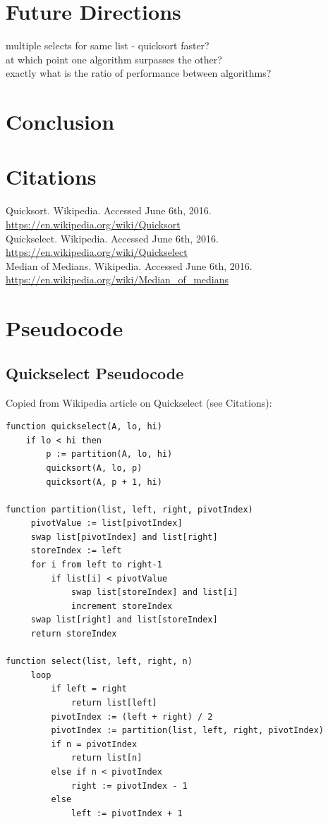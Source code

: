 \documentclass{article}
\begin{document}
\section*{Future Directions}
multiple selects for same list - quicksort faster?\\

at which point one algorithm surpasses the other?\\

exactly what is the ratio of performance between algorithms?

\section*{Conclusion}

\section*{Citations}
Quicksort. Wikipedia. Accessed June 6th, 2016. \url{https://en.wikipedia.org/wiki/Quicksort}\\

\noindent Quickselect. Wikipedia. Accessed June 6th, 2016. \url{https://en.wikipedia.org/wiki/Quickselect}\\

\noindent Median of Medians. Wikipedia. Accessed June 6th, 2016. \url{https://en.wikipedia.org/wiki/Median_of_medians}

\pagebreak

\section*{Pseudocode}

\subsection*{Quickselect Pseudocode}
Copied from Wikipedia article on Quickselect (see Citations):
\begin{lstlisting}
function quickselect(A, lo, hi)
    if lo < hi then
        p := partition(A, lo, hi)
        quicksort(A, lo, p)
        quicksort(A, p + 1, hi)
        
function partition(list, left, right, pivotIndex)
     pivotValue := list[pivotIndex]
     swap list[pivotIndex] and list[right]
     storeIndex := left
     for i from left to right-1
         if list[i] < pivotValue
             swap list[storeIndex] and list[i]
             increment storeIndex
     swap list[right] and list[storeIndex]
     return storeIndex
     
function select(list, left, right, n)
     loop
         if left = right
             return list[left]
         pivotIndex := (left + right) / 2
         pivotIndex := partition(list, left, right, pivotIndex)
         if n = pivotIndex
             return list[n]
         else if n < pivotIndex
             right := pivotIndex - 1
         else
             left := pivotIndex + 1
\end{lstlisting}
\end{document}
